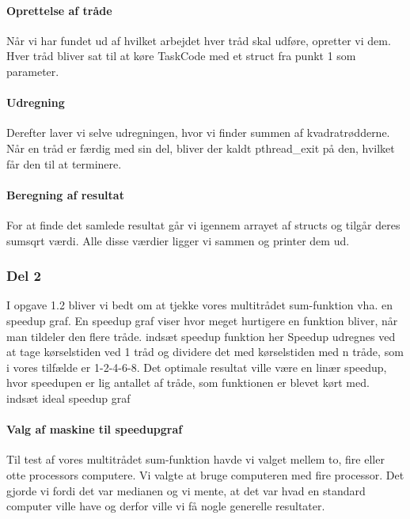 \paragraph{Oprettelse af tråde} Når vi har fundet ud af hvilket arbejdet hver tråd skal udføre, opretter vi dem. Hver tråd bliver sat til at køre TaskCode med et struct fra punkt 1 som parameter.
\paragraph{Udregning} Derefter laver vi selve udregningen, hvor vi finder summen af kvadratrødderne. Når en tråd er færdig med sin del, bliver der kaldt pthread_exit på den, hvilket får den til at terminere.
\paragraph{Beregning af resultat} For at finde det samlede resultat går vi igennem arrayet af structs og tilgår deres sumsqrt værdi. Alle disse værdier ligger vi sammen og printer dem ud.

\subsubsection{Del 2}
\label{O1_2}
I opgave 1.2 bliver vi bedt om at tjekke vores multitrådet sum-funktion vha. en speedup graf.
En speedup graf viser hvor meget hurtigere en funktion bliver, når man tildeler den flere tråde. 
indsæt speedup funktion her\n\n
Speedup udregnes ved at tage kørselstiden ved 1 tråd og dividere det med kørselstiden med n tråde, som i vores tilfælde er 1-2-4-6-8. Det optimale resultat ville være en linær speedup, hvor speedupen er lig antallet af tråde, som funktionen er blevet kørt med.
indsæt ideal speedup graf

\paragraph{Valg af maskine til speedupgraf}
Til test af vores multitrådet sum-funktion havde vi valget mellem to, fire eller otte processors computere. Vi valgte at bruge computeren med fire processor. Det gjorde vi fordi det var medianen og vi mente, at det var hvad en standard computer ville have og derfor ville vi få nogle generelle resultater. 

